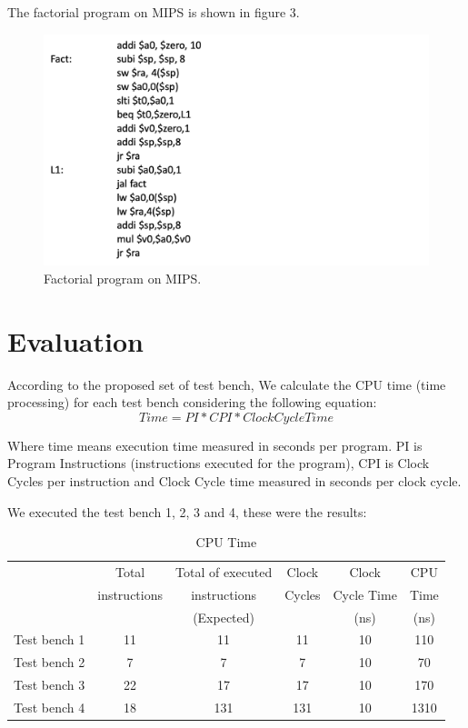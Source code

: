 \documentclass[conference]{IEEEtran}
\begin{document}
The factorial program on MIPS is shown in figure 3.
\begin{figure}[h]
\begin{center}
\includegraphics[scale=0.45]{MIPS_Factorial.png}
\caption{Factorial program on MIPS.}
\label{fact_mips}
\end{center}
\end{figure}
 
\section{Evaluation}

According to the proposed set of test bench, We calculate the CPU time \cite{b5} (time processing) for each test bench considering the following equation:
\[Time = PI * CPI * Clock Cycle Time\] 

Where time means execution time measured in seconds per program. PI is Program Instructions (instructions executed for the program), CPI is Clock Cycles per instruction and Clock Cycle time measured in seconds per clock cycle.

We executed the test bench 1, 2, 3 and 4, these were the results:

\begin{table}[h]
	\caption{CPU Time} %
	\begin{center}
		\begin{tabular}{|c|c|c|c|c|c|}
			\hline
			&Total&Total of executed&Clock&Clock&CPU\\
			&instructions&instructions&Cycles&Cycle Time&Time\\
			&&(Expected)&&(ns)&(ns)\\
			\hline
			Test bench 1&11&11&11&10&110\\
			\hline
			Test bench 2&7&7&7&10&70\\
			\hline
			Test bench 3&22&17&17&10&170\\
			\hline
			Test bench 4&18&131&131&10&1310\\
			\hline
		\end{tabular}
		\label{tab_test3}
	\end{center}
\end{table}
\end{document}
